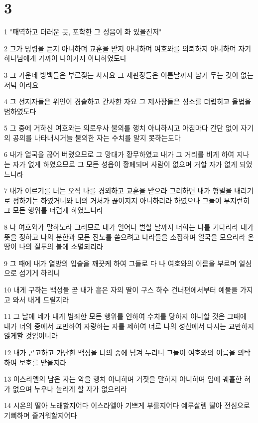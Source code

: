 \chapter{3}

\par 1 "패역하고 더러운 곳, 포학한 그 성읍이 화 있을진저"
\par 2 그가 명령을 듣지 아니하며 교훈을 받지 아니하며 여호와를 의뢰하지 아니하며 자기 하나님에게 가까이 나아가지 아니하였도다
\par 3 그 가운데 방백들은 부르짖는 사자요 그 재판장들은 이튿날까지 남겨 두는 것이 없는 저녁 이리요
\par 4 그 선지자들은 위인이 경솔하고 간사한 자요 그 제사장들은 성소를 더럽히고 율법을 범하였도다
\par 5 그 중에 거하신 여호와는 의로우사 불의를 행치 아니하시고 아침마다 간단 없이 자기의 공의를 나타내시거늘 불의한 자는 수치를 알지 못하는도다
\par 6 내가 열국을 끊어 버렸으므로 그 망대가 황무하였고 내가 그 거리를 비게 하여 지나는 자가 없게 하였으므로 그 모든 성읍이 황폐되며 사람이 없으며 거할 자가 없게 되었느니라
\par 7 내가 이르기를 너는 오직 나를 경외하고 교훈을 받으라 그리하면 내가 형벌을 내리기로 정하기는 하였거니와 너의 거처가 끊어지지 아니하리라 하였으나 그들이 부지런히 그 모든 행위를 더럽게 하였느니라
\par 8 나 여호와가 말하노라 그러므로 내가 일어나 벌할 날까지 너희는 나를 기다리라 내가 뜻을 정하고 나의 분한과 모든 진노를 쏟으려고 나라들을 소집하며 열국을 모으리라 온 땅이 나의 질투의 불에 소멸되리라
\par 9 그 때에 내가 열방의 입술을 깨끗케 하여 그들로 다 나 여호와의 이름을 부르며 일심으로 섬기게 하리니
\par 10 내게 구하는 백성들 곧 내가 흩은 자의 딸이 구스 하수 건너편에서부터 예물을 가지고 와서 내게 드릴지라
\par 11 그 날에 네가 내게 범죄한 모든 행위를 인하여 수치를 당하지 아니할 것은 그때에 내가 너의 중에서 교만하여 자랑하는 자를 제하여 너로 나의 성산에서 다시는 교만하지 않게할 것임이니라
\par 12 내가 곤고하고 가난한 백성을 너의 중에 남겨 두리니 그들이 여호와의 이름을 의탁하여 보호를 받을지라
\par 13 이스라엘의 남은 자는 악을 행치 아니하며 거짓을 말하지 아니하며 입에 궤휼한 혀가 없으며 누우나 놀라게 할 자가 없으리라
\par 14 시온의 딸아 노래할지어다 이스라엘아 기쁘게 부를지어다 예루살렘 딸아 전심으로 기뻐하며 즐거워할지어다
